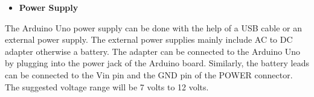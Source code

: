 	
	
	
	\vspace{3\baselineskip}
	\begin{itemize}
		\item \textbf{Power Supply}
	
	\end{itemize}
    The Arduino Uno power supply can be done with the help of a USB cable or an external power supply. The external power supplies mainly include AC to DC adapter otherwise a battery. The adapter can be connected to the Arduino Uno by plugging into the power jack of the Arduino board. Similarly, the battery leads can be connected to the Vin pin and the GND pin of the POWER connector. The suggested voltage range will be 7 volts to 12 volts.

       

	
	
